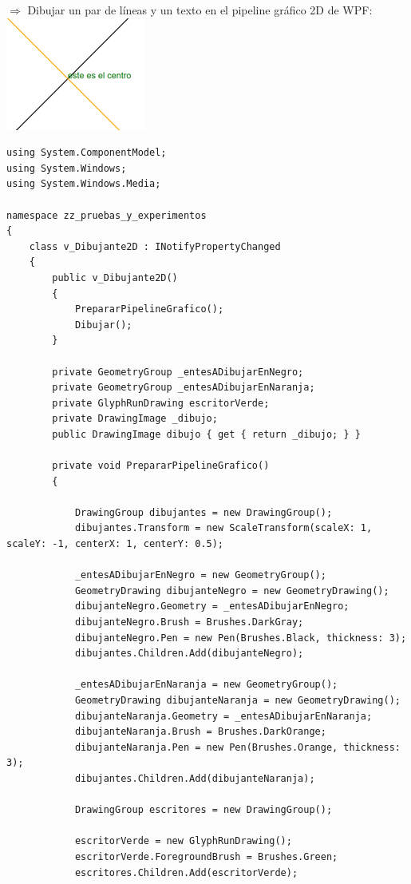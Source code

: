 \documentclass[spanish,12pt,a4paper,final,oneside]{book}
\begin{document}
$\Rightarrow$ Dibujar un par de líneas y un texto en el pipeline gráfico 2D de WPF:
\\ \includegraphics{Dibujar en el pipeline 2D de WPF}   

\begin{lstlisting}[frame=single] 
using System.ComponentModel;
using System.Windows;
using System.Windows.Media;
 
namespace zz_pruebas_y_experimentos
{
	class v_Dibujante2D : INotifyPropertyChanged
	{
    	public v_Dibujante2D()
    	{
            PrepararPipelineGrafico();
        	Dibujar();
    	}
 
    	private GeometryGroup _entesADibujarEnNegro;
    	private GeometryGroup _entesADibujarEnNaranja;
    	private GlyphRunDrawing escritorVerde;
    	private DrawingImage _dibujo;
    	public DrawingImage dibujo { get { return _dibujo; } }
 
    	private void PrepararPipelineGrafico()
    	{
 
        	DrawingGroup dibujantes = new DrawingGroup();
        	dibujantes.Transform = new ScaleTransform(scaleX: 1, scaleY: -1, centerX: 1, centerY: 0.5);
 
        	_entesADibujarEnNegro = new GeometryGroup();
        	GeometryDrawing dibujanteNegro = new GeometryDrawing();
        	dibujanteNegro.Geometry = _entesADibujarEnNegro;
        	dibujanteNegro.Brush = Brushes.DarkGray;
        	dibujanteNegro.Pen = new Pen(Brushes.Black, thickness: 3);
            dibujantes.Children.Add(dibujanteNegro);
 
        	_entesADibujarEnNaranja = new GeometryGroup();
        	GeometryDrawing dibujanteNaranja = new GeometryDrawing();
        	dibujanteNaranja.Geometry = _entesADibujarEnNaranja;
    	    dibujanteNaranja.Brush = Brushes.DarkOrange;
        	dibujanteNaranja.Pen = new Pen(Brushes.Orange, thickness: 3);
            dibujantes.Children.Add(dibujanteNaranja);
 
        	DrawingGroup escritores = new DrawingGroup();
 
        	escritorVerde = new GlyphRunDrawing();
        	escritorVerde.ForegroundBrush = Brushes.Green;
            escritores.Children.Add(escritorVerde);
 

\end{lstlisting}
\end{document}
